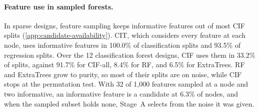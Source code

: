 \paragraph{Feature use in sampled forests.}
In sparse designs, feature sampling keeps informative features out of most CIF
splits (\cref{app:candidate-availability}). CIT, which considers every feature
at each node, uses informative features in 100.0\% of classification splits
and 93.5\% of regression splits. Over the 12 classification forest designs,
CIF uses them in 33.2\% of splits, against 91.7\% for CIF-all, 8.4\% for RF,
and 6.5\% for ExtraTrees. RF and ExtraTrees grow to purity, so most of their
splits are on noise, while CIF stops at the permutation test. With
32 of 1,000 features sampled at a node and two informative, an informative
feature is a candidate at 6.3\% of nodes, and when the sampled subset holds
none, Stage~A selects from the noise it was given.

